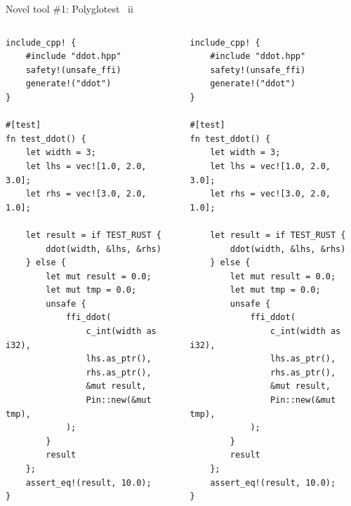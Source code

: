 \documentclass[10pt,aspectratio=169]{beamer}
\begin{document}
\begin{frame}[fragile]{Novel tool \#1: Polyglotest \ ii}
        \begin{columns}[T,onlytextwidth]
            \centering
            \begin{verbatim}
include_cpp! {
    #include "ddot.hpp"
    safety!(unsafe_ffi)
    generate!("ddot")
}

#[test]
fn test_ddot() {
    let width = 3;
    let lhs = vec![1.0, 2.0, 3.0];
    let rhs = vec![3.0, 2.0, 1.0];

    let result = if TEST_RUST {
        ddot(width, &lhs, &rhs)
    } else {
        let mut result = 0.0;
        let mut tmp = 0.0;
        unsafe {
            ffi_ddot(
                c_int(width as i32),
                lhs.as_ptr(),
                rhs.as_ptr(),
                &mut result,
                Pin::new(&mut tmp),
            );
        }
        result
    };
    assert_eq!(result, 10.0);
}
            \end{verbatim}
            \begin{verbatim}
include_cpp! {
    #include "ddot.hpp"
    safety!(unsafe_ffi)
    generate!("ddot")
}

#[test]
fn test_ddot() {
    let width = 3;
    let lhs = vec![1.0, 2.0, 3.0];
    let rhs = vec![3.0, 2.0, 1.0];

    let result = if TEST_RUST {
        ddot(width, &lhs, &rhs)
    } else {
        let mut result = 0.0;
        let mut tmp = 0.0;
        unsafe {
            ffi_ddot(
                c_int(width as i32),
                lhs.as_ptr(),
                rhs.as_ptr(),
                &mut result,
                Pin::new(&mut tmp),
            );
        }
        result
    };
    assert_eq!(result, 10.0);
}
            \end{verbatim}
        \end{columns}
\end{frame}
\end{document}
